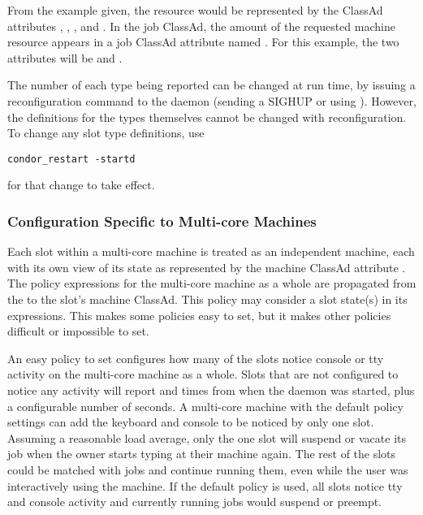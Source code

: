 \begin{description}
From the example given, the  resource would be represented by
the ClassAd attributes
, , , and .
In the job ClassAd, 
the amount of the requested machine resource appears 
in a job ClassAd attribute named .
For this example,
the two attributes will be  and .

The number of each type being
reported can be changed at run time, by issuing a reconfiguration
command to
the  daemon (sending a SIGHUP or using ).
However, the definitions for the types themselves cannot be changed
with reconfiguration.
To change any slot type definitions, use 
\begin{verbatim}
condor_restart -startd
\end{verbatim}
for that change to take effect.

\end{description}

\subsubsection{\label{sec:Config-SMP-Policy}
Configuration Specific to Multi-core Machines}

Each slot within a multi-core machine is treated as an
independent machine,
each with its own view of its state as represented by the
machine ClassAd attribute .
The policy expressions for the multi-core machine
as a whole are propagated from the 
to the slot's machine ClassAd.
This policy may consider a slot state(s) in its expressions.
This makes some policies easy to set, but it makes
other policies difficult or impossible to set.

An easy policy to set
configures how many of the slots
notice console or tty activity on the multi-core machine as a whole.
Slots that are not configured to notice any activity will report
 and  times from when the
 daemon was started,
plus a configurable number of seconds.
A multi-core machine with the default policy
settings can add the keyboard and console to be noticed by only one slot.
Assuming a reasonable load average,
only the one slot will suspend or vacate its job
when the owner starts typing at their machine again.
The rest of the slots could be matched with jobs and continue running them,
even while the user was interactively using the
machine. 
If the default policy is used,
all slots notice
tty and console activity
and
currently running jobs would suspend or preempt.

